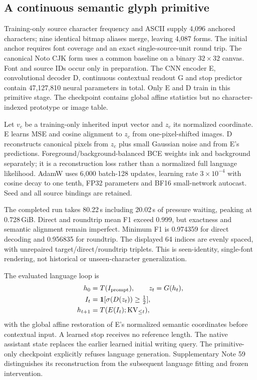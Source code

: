 \subsection*{A continuous semantic glyph primitive}
Training-only source character frequency and ASCII supply 4,096 anchored
characters; nine identical bitmap aliases merge, leaving 4,087 forms. The
initial anchor requires font coverage and an exact single-source-unit round
trip. The canonical Noto CJK form uses a common baseline on a binary
$32\times32$ canvas. Font and source IDs occur only in preparation.
The CNN encoder E, convolutional decoder D, continuous contextual readout G
and stop predictor contain 47,127,810 neural parameters in total. Only E and
D train in this primitive stage. The checkpoint contains global affine
statistics but no character-indexed prototype or image table.

Let $v_c$ be a training-only inherited input vector and $z_c$ its normalized
coordinate. E learns MSE and cosine alignment to $z_c$ from one-pixel-shifted
images. D reconstructs canonical pixels from $z_c$ plus small Gaussian noise
and from E's predictions. Foreground/background-balanced BCE weights ink
and background separately; it is a reconstruction loss rather than a
normalized full language likelihood. AdamW uses 6,000 batch-128 updates,
learning rate $3\times10^{-4}$ with cosine decay to one tenth, FP32 parameters
and BF16 small-network autocast. Seed and all source bindings are retained.

The completed run takes 80.22\,s including 20.02\,s of pressure waiting,
peaking at 0.728\,GiB. Direct and roundtrip mean F1 exceed 0.999, but exactness
and semantic alignment remain imperfect. Minimum F1 is 0.974359 for direct
decoding and 0.956835 for roundtrip. The displayed 64 indices are evenly
spaced, with unrepaired target/direct/roundtrip triplets. This is seen-identity,
single-font rendering, not historical or unseen-character generalization.

The evaluated language loop is
\begin{align*}
h_0&=T(I_{\rm prompt}),\qquad z_t=G(h_t),\\
I_t&={\bf1}[\sigma(D(z_t))\geq\tfrac12],\\
h_{t+1}&=T(E(I_t);\mathrm{KV}_{\leq t}),
\end{align*}
with the global affine restoration of E's normalized semantic coordinates
before contextual input. A learned stop receives no reference length. The
native assistant state replaces the earlier learned initial writing query.
The primitive-only checkpoint explicitly refuses language generation.
Supplementary Note 59 distinguishes its reconstruction from the subsequent
language fitting and frozen intervention.

